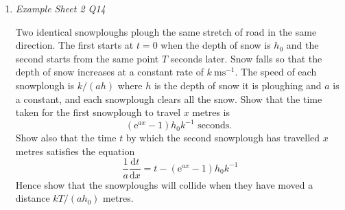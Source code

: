 \documentclass[11pt]{article}
\newlength{\qspace}
\newcounter{qnumber}
\newenvironment{question}%
 {\vspace{\qspace}
  \begin{enumerate}[\bfseries 1\quad][10]%
    \setcounter{enumi}{\value{qnumber}}%
    \item%
 }
{
  \end{enumerate}
  \filbreak
  \stepcounter{qnumber}
 }
\begin{document}
\begin{question}\textit{Example Sheet 2 Q14}
  
  Two identical snowploughs plough the same stretch of road in the same direction. The first starts at $t=0$ when the depth of snow is $h_{0}$ and the second starts from the same point $T$ seconds later. Snow falls so that the depth of snow increases at a constant rate of $k \mathrm{~ms}^{-1}$. The speed of each snowplough is $k /(a h)$ where $h$ is the depth of snow it is ploughing and $a$ is a constant, and each snowplough clears all the snow. Show that the time taken for the first snowplough to travel $x$ metres is
  \[
  \left(\mathrm{e}^{a x}-1\right) h_{0} k^{-1} \text { seconds. }
  \]
  Show also that the time $t$ by which the second snowplough has travelled $x$ metres satisfies the equation
  \[
  \frac{1}{a} \frac{\mathrm{d} t}{\mathrm{d} x}=t-\left(\mathrm{e}^{a x}-1\right) h_{0} k^{-1}
  \]
  Hence show that the snowploughs will collide when they have moved a distance $k T /\left(a h_{0}\right)$ metres.
\end{question}
\end{document}
